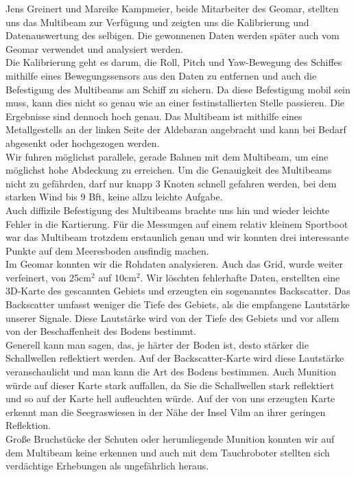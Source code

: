 Jens Greinert und Mareike Kampmeier, beide Mitarbeiter des Geomar, stellten uns das Multibeam zur Verfügung und zeigten uns die Kalibrierung und Datenauswertung des selbigen. Die gewonnenen Daten werden später auch vom Geomar verwendet und analysiert werden. \\

Die Kalibrierung geht es darum, die Roll, Pitch und Yaw-Bewegung des Schiffes mithilfe eines Bewegungssensors aus den Daten zu 
entfernen und auch die Befestigung des Multibeams am Schiff zu sichern. Da diese Befestigung mobil sein muss, kann
dies nicht so genau wie an einer festinstallierten Stelle passieren. Die Ergebnisse sind dennoch hoch genau. 
Das Multibeam ist mithilfe eines Metallgestells an der linken Seite der Aldebaran angebracht und kann bei Bedarf 
abgesenkt oder hochgezogen werden.\\

Wir fuhren möglichst parallele, gerade Bahnen mit dem Multibeam, um eine möglichst hohe Abdeckung zu erreichen. 
Um die Genauigkeit des Multibeams nicht zu gefährden, darf nur knapp 3 Knoten schnell gefahren werden, bei dem starken Wind bis 9 Bft, keine allzu leichte Aufgabe. \\

Auch diffizile Befestigung des Multibeams brachte uns hin und wieder leichte Fehler in die Kartierung. Für die Messungen auf einem relativ kleinem Sportboot war das Multibeam trotzdem erstaunlich genau und wir konnten drei interessante Punkte auf dem 
Meeresboden ausfindig machen. \\

Im Geomar konnten wir die Rohdaten analysieren. Auch das Grid, wurde weiter verfeinert, von 25cm$^2$ auf 10cm$^2$. 
Wir löschten fehlerhafte Daten, erstellten eine 3D-Karte des gescannten Gebiets und erzeugten ein sogenanntes \glqq Backscatter\grqq . 
Das Backscatter umfasst weniger die Tiefe des Gebiets, als die empfangene Lautstärke unserer Signale. 
Diese Lautstärke wird von der Tiefe des Gebiets und vor allem von der Beschaffenheit des Bodens bestimmt. \\

Generell kann man sagen, das, je härter der Boden ist, desto stärker die Schallwellen reflektiert werden. 
Auf der Backscatter-Karte wird diese Lautstärke veranschaulicht und man kann die Art des Bodens bestimmen.
Auch Munition würde auf dieser Karte stark auffallen, da Sie die Schallwellen stark reflektiert und so 
auf der Karte hell aufleuchten würde. Auf der von uns erzeugten Karte erkennt man die Seegraswiesen in der Nähe der Insel Vilm an ihrer geringen Reflektion.\\

Große Bruchstücke der Schuten oder herumliegende Munition konnten wir auf dem Multibeam keine erkennen und 
auch mit dem Tauchroboter stellten sich verdächtige Erhebungen als ungefährlich heraus. \\
